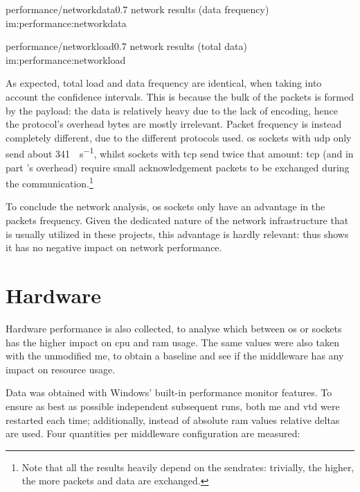 \begin{image}
	{performance/networkdata}{0.7}
	{network results (data frequency)}
	{im:performance:networkdata}
	{}
	{}
\end{image}

\begin{image}
	{performance/networkload}{0.7}
	{network results (total data)}
	{im:performance:networkload}
	{}
	{}
\end{image}

As expected, total load and data frequency are identical, when taking into account the confidence intervals. This is because the bulk of the packets is formed by the payload: the data is relatively heavy due to the lack of encoding, hence the protocol's overhead bytes are mostly irrelevant. Packet frequency is instead completely different, due to the different protocols used. \gls{os} sockets with \gls{udp} only send about \SI{341}{\packets\per\second}, whilst  sockets with \gls{tcp} send twice that amount: \gls{tcp} (and in part 's overhead) require small acknowledgement packets to be exchanged during the communication.\footnote{Note that all the results heavily depend on the sendrates: trivially, the higher, the more packets and data are exchanged.}

To conclude the network analysis, \gls{os} sockets only have an advantage in the packets frequency. Given the dedicated nature of the network infrastructure that is usually utilized in these projects, this advantage is hardly relevant:  thus shows it has no negative impact on network performance.

\section{Hardware}\label{sc:performance:hardware}



Hardware performance is also collected, to analyse which between \gls{os} or  sockets has the higher impact on \gls{cpu} and \gls{ram} usage. The same values were also taken with the unmodified \gls{me}, to obtain a baseline and see if the \gls{middleware} has any impact on resource usage.

Data was obtained with Windows' built-in performance monitor features. To ensure as best as possible independent subsequent runs, both \gls{me} and \gls{vtd} were restarted each time; additionally, instead of absolute \gls{ram} values relative deltas are used. Four quantities per \gls{middleware} configuration are measured:

